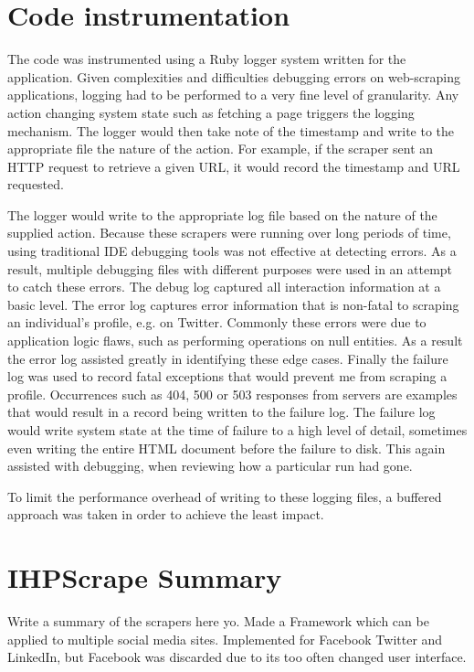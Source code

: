 


\section{Code instrumentation}

The code was instrumented using a Ruby logger system written for the application. Given complexities and difficulties debugging errors on web-scraping applications, logging had to be performed to a very fine level of granularity. Any action changing system state such as fetching a page triggers the logging mechanism. The logger would then take note of the timestamp and write to the appropriate file the nature of the action. For example, if the scraper sent an HTTP request to retrieve a given URL, it would record the timestamp and URL requested. 

The logger would write to the appropriate log file based on the nature of the supplied action. Because these scrapers were running over long periods of time, using traditional IDE debugging tools was not effective at detecting errors. As a result, multiple debugging files with different purposes were used in an attempt to catch these errors. The debug log captured all interaction information at a basic level. The error log captures error information that is non-fatal to scraping an individual's profile, e.g. on Twitter. Commonly these errors were due to application logic flaws, such as performing operations on null entities. As a result the error log assisted greatly in identifying these edge cases. Finally the failure log was used to record fatal exceptions that would prevent me from scraping a profile. Occurrences such as 404, 500 or 503 responses from servers are examples that would result in a record being written to the failure log. The failure log would write system state at the time of failure to a high level of detail, sometimes even writing the entire HTML document before the failure to disk. This again assisted with debugging, when reviewing how a particular run had gone. 

To limit the performance overhead of writing to these logging files, a buffered approach was taken in order to achieve the least impact. 

\section{IHPScrape Summary}

Write a summary of the scrapers here yo. Made a Framework which can be applied to multiple social media sites. Implemented for Facebook Twitter and LinkedIn, but Facebook was discarded due to its too often changed user interface. 


